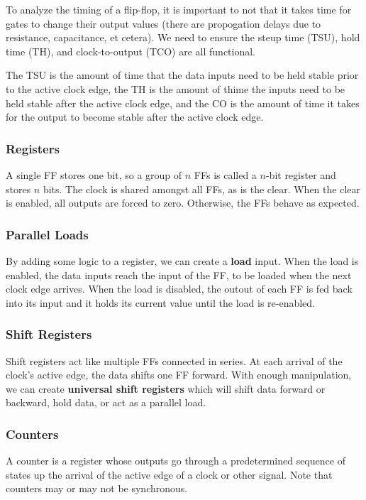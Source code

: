 \documentclass[12pt]{article}
\begin{document}
To analyze the timing of a flip-flop, it is important to not that it takes time for gates to change their output values (there are propogation delays due to resistance, capacitance, et cetera). We need to ensure the steup time (TSU), hold time (TH), and clock-to-output (TCO) are all functional.

The TSU is the amount of time that the data inputs need to be held stable prior to the active clock edge, the TH is the amount of thime the inputs need to be held stable after the active clock edge, and the CO is the amount of time it takes for the output to become stable after the active clock edge.

\subsubsection*{Registers}
A single FF stores one bit, so a group of $n$ FFs is called a $n$-bit register and stores $n$ bits. The clock is shared amongst all FFs, as is the clear. When the clear is enabled, all outputs are forced to zero. Otherwise, the FFs behave as expected.

\subsubsection*{Parallel Loads}
By adding some logic to a register, we can create a {\bf load} input. When the load is enabled, the data inputs reach the input of the FF, to be loaded when the next clock edge arrives. When the load is disabled, the outout of each FF is fed back into its input and it holds its current value until the load is re-enabled.

\subsubsection*{Shift Registers}
Shift registers act like multiple FFs connected in series. At each arrival of the clock's active edge, the data shifts one FF forward. With enough manipulation, we can create {\bf universal shift registers} which will shift data forward or backward, hold data, or act as a parallel load.

\subsubsection*{Counters}
A counter is a register whose outputs go through a predetermined sequence of states up the arrival of the active edge of a clock or other signal. Note that counters may or may not be synchronous.
\end{document}

